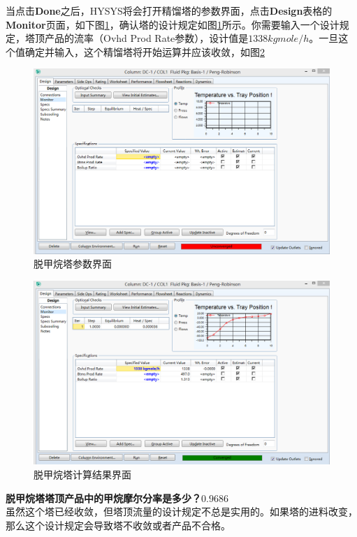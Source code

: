 \documentclass[UTF8]{ctexart}
\begin{document}
当点击\textbf{Done}之后，HYSYS将会打开精馏塔的参数界面，点击\textbf{Design}表格的\textbf{Monitor}页面，如下图\ref{figure4}，确认塔的设计规定如图\ref{figure4}所示。你需要输入一个设计规定，塔顶产品的流率（Ovhd Prod Rate参数），设计值是$1338kgmole/h$。一旦这个值确定并输入，这个精馏塔将开始运算并应该收敛，如图\ref{figure5}
	\begin{figure}[h]
	\centering
	\includegraphics[scale=0.3]{DC1_Monitor.PNG}
	\caption{脱甲烷塔参数界面}
	\label{figure4}
	\end{figure}
	\begin{figure}[h]
	\centering
	\includegraphics[scale=0.3]{DC1_Output.PNG}
	\caption{脱甲烷塔计算结果界面}
	\label{figure5}
	\end{figure}
\newpage	
\textbf{脱甲烷塔塔顶产品中的甲烷摩尔分率是多少？}\underline{$0.9686$}\\
\newline
虽然这个塔已经收敛，但塔顶流量的设计规定不总是实用的。如果塔的进料改变，那么这个设计规定会导致塔不收敛或者产品不合格。
\end{document}
